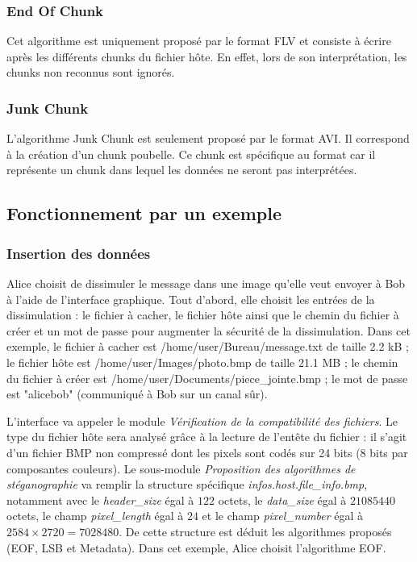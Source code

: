 \documentclass[11pt]{article}
\begin{document}
\subsubsection{End Of Chunk}

Cet algorithme est uniquement proposé par le format FLV et consiste à 
écrire après les différents chunks du fichier hôte. En effet, lors de 
son interprétation, les chunks non reconnus sont ignorés.

\subsubsection{Junk Chunk}

L'algorithme Junk Chunk est seulement proposé par le format AVI. Il correspond à
la création d'un chunk poubelle. Ce chunk est spécifique au format car il
représente un chunk dans lequel les données ne seront pas interprétées. 

\subsection{Fonctionnement par un exemple}

\subsubsection{Insertion des données}

Alice choisit de dissimuler le message dans une image qu'elle veut envoyer 
à Bob à l'aide de l'interface graphique. 
Tout d'abord, elle choisit les entrées de la dissimulation : le fichier 
à cacher, le fichier hôte ainsi que le chemin du fichier à créer et un mot 
de passe pour augmenter la sécurité de la dissimulation. 
Dans cet exemple, le fichier à cacher est /home/user/Bureau/message.txt 
de taille 2.2 kB ; le fichier hôte est /home/user/Images/photo.bmp 
de taille 21.1 MB ; le chemin du fichier à créer est 
/home/user/Documents/piece\_jointe.bmp ; le mot de passe est "alicebob" 
(communiqué à Bob sur un canal sûr). 

L'interface va appeler le module \textit{Vérification de la compatibilité 
des fichiers}. Le type du fichier hôte sera analysé grâce à la lecture 
de l'entête du fichier : il s'agit d'un fichier BMP non compressé dont les 
pixels sont codés sur 24 bits (8 bits par composantes couleurs). 
Le sous-module \textit{Proposition des algorithmes de stéganographie} va 
remplir la structure spécifique 
\textit{infos.host.file\_info.bmp}, notamment avec le 
\textit{header\_size} égal à $122$ octets, le \textit{data\_size} égal à 
$21085440$ octets, le champ \textit{pixel\_length} égal à $24$ et le champ 
\textit{pixel\_number} égal à $2584 \times 2720 = 7028480$. De cette structure
est déduit les algorithmes proposés (EOF, LSB et Metadata). 
Dans cet exemple, Alice choisit l'algorithme EOF. 
\end{document}
